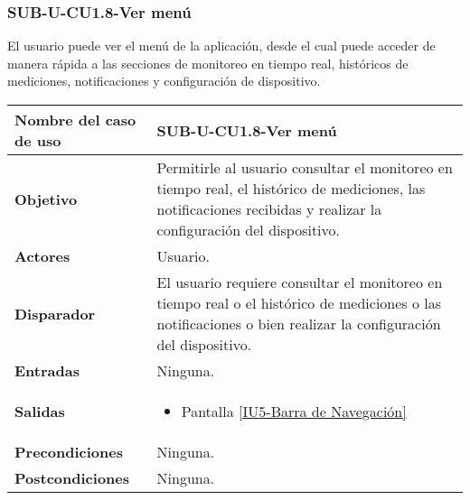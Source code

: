 \subsubsection{SUB-U-CU1.8-Ver menú}\label{SUB-U-CU1.8}
El usuario puede ver el menú de la aplicación, desde el cual puede acceder de manera rápida a las secciones de monitoreo en tiempo real, históricos de mediciones, notificaciones y configuración de dispositivo.

\begin{longtable}{|J{5cm}|J{10.3cm}|}
	\hline
	\textbf{Nombre del caso de uso} &
		SUB-U-CU1.8-Ver menú \\ \hline
	\textbf{Objetivo} &
		Permitirle al usuario consultar el monitoreo en tiempo real, el histórico de mediciones, las notificaciones recibidas y realizar la configuración del dispositivo. \\ \hline
	\textbf{Actores} &
		Usuario. \\ \hline 
	\textbf{Disparador} & 
		El usuario requiere consultar el monitoreo en tiempo real o el histórico de mediciones o las notificaciones o bien realizar la configuración del dispositivo.\\ \hline 
	\textbf{Entradas} & Ninguna.
		\\ \hline 
	\textbf{Salidas} & 
		\begin{itemize}
			\item Pantalla \hyperref[fig:Barra de navegacion]{[IU5-Barra de Navegación]} 
		\end{itemize} \\ \hline
	\textbf{Precondiciones} &
		Ninguna.\\ \hline
	\textbf{Postcondiciones} & Ninguna.
		\\ \hline

\end{longtable}
